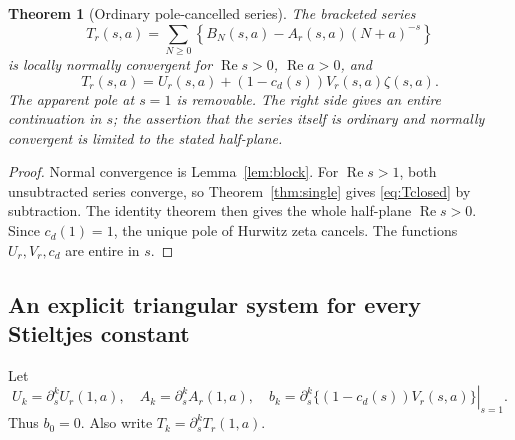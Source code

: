 \documentclass[11pt,letterpaper]{article}
\numberwithin{equation}{section}
\newtheorem{theorem}{Theorem}[section]
\theoremstyle{definition}\newtheorem{definition}[theorem]{Definition}
\theoremstyle{remark}\newtheorem{remark}[theorem]{Remark}
\DeclareMathOperator{\Rea}{Re}
\begin{document}
\begin{theorem}[Ordinary pole-cancelled series]\label{thm:subtraction}
The bracketed series
\begin{equation}\label{eq:T}
 T_r(s,a)=\sum_{N\ge0}\left\{B_N(s,a)-A_r(s,a)(N+a)^{-s}\right\}
\end{equation}
is locally normally convergent for $\Rea s>0$, $\Rea a>0$, and
\begin{equation}\label{eq:Tclosed}
 \boxed{\displaystyle
 T_r(s,a)=U_r(s,a)+(1-c_d(s))V_r(s,a)\zeta(s,a).}
\end{equation}
The apparent pole at $s=1$ is removable. The right side gives an entire
continuation in $s$; the assertion that the series itself is ordinary
and normally convergent is limited to the stated half-plane.
\end{theorem}
\begin{proof}
Normal convergence is Lemma~\ref{lem:block}. For $\Rea s>1$, both
unsubtracted series converge, so Theorem~\ref{thm:single} gives
\eqref{eq:Tclosed} by subtraction. The identity theorem then gives the
whole half-plane $\Rea s>0$. Since $c_d(1)=1$, the unique pole of
Hurwitz zeta cancels. The functions $U_r,V_r,c_d$ are entire in $s$.
\end{proof}

\subsection{An explicit triangular system for every Stieltjes constant}
Let
\begin{equation}\label{eq:jetdefs}
 U_k=\partial_s^kU_r(1,a),\quad
 A_k=\partial_s^kA_r(1,a),\quad
 b_k=\left.\partial_s^k\{(1-c_d(s))V_r(s,a)\}\right|_{s=1}.
\end{equation}
Thus $b_0=0$. Also write $T_k=\partial_s^kT_r(1,a)$.
\end{document}
